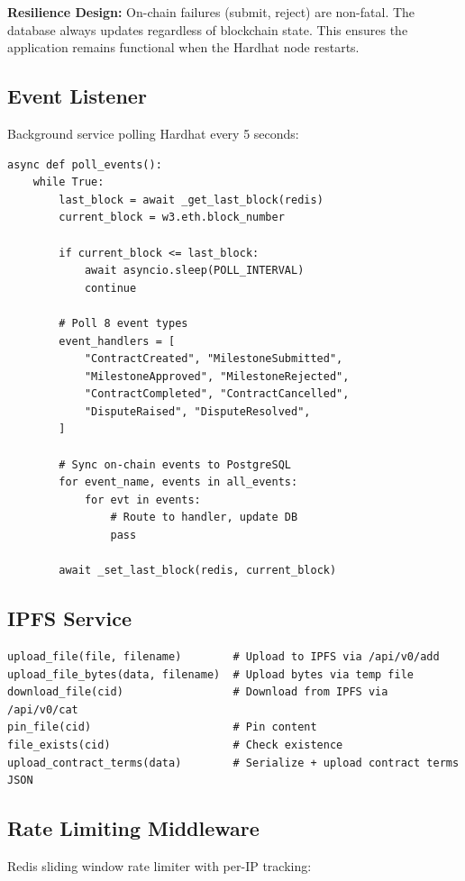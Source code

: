 \documentclass[12pt,a4paper]{article}
\begin{document}
\textbf{Resilience Design:} On-chain failures (submit, reject) are non-fatal. The database always updates regardless of blockchain state. This ensures the application remains functional when the Hardhat node restarts.

\subsection{Event Listener}
Background service polling Hardhat every 5 seconds:

\begin{lstlisting}[style=pythonstyle]
async def poll_events():
    while True:
        last_block = await _get_last_block(redis)
        current_block = w3.eth.block_number

        if current_block <= last_block:
            await asyncio.sleep(POLL_INTERVAL)
            continue

        # Poll 8 event types
        event_handlers = [
            "ContractCreated", "MilestoneSubmitted",
            "MilestoneApproved", "MilestoneRejected",
            "ContractCompleted", "ContractCancelled",
            "DisputeRaised", "DisputeResolved",
        ]

        # Sync on-chain events to PostgreSQL
        for event_name, events in all_events:
            for evt in events:
                # Route to handler, update DB
                pass

        await _set_last_block(redis, current_block)
\end{lstlisting}

\subsection{IPFS Service}
\begin{lstlisting}[style=pythonstyle]
upload_file(file, filename)        # Upload to IPFS via /api/v0/add
upload_file_bytes(data, filename)  # Upload bytes via temp file
download_file(cid)                 # Download from IPFS via /api/v0/cat
pin_file(cid)                      # Pin content
file_exists(cid)                   # Check existence
upload_contract_terms(data)        # Serialize + upload contract terms JSON
\end{lstlisting}

\subsection{Rate Limiting Middleware}
Redis sliding window rate limiter with per-IP tracking:
\end{document}
